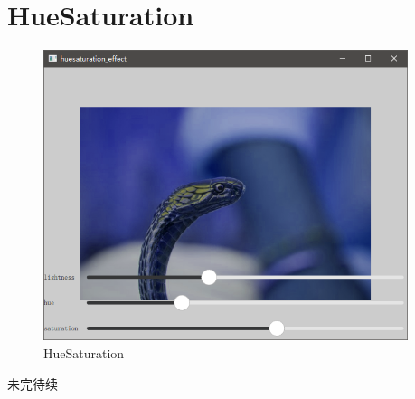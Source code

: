 ﻿




\FloatBarrier
\section{
HueSaturation
}\label{c000015s000008}


\begin{figure}[htb] %
\marginnote{\setlength\fboxsep{2pt}\fbox{\footnotesize{\kaishu\figurename\,}\footnotesize{\ref{p000024}}}}\centering %
\includegraphics[width=0.95\textwidth]{../chapter06/huesaturation_effect/the_app.png} %
\caption{HueSaturation} %
\label{p000024} %
\end{figure}


未完待续









